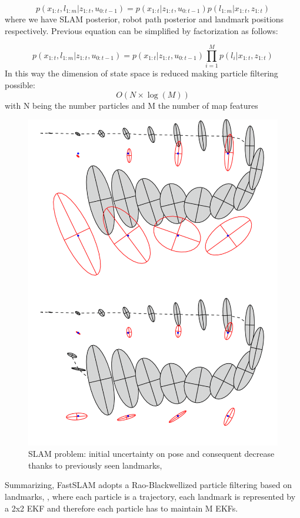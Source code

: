 \begin{equation}
    p(x_{1:t},l_{1:m} | z_{1:t},u_{0:t-1}) = p(x_{1:t} | z_{1:t},u_{0:t-1})p(l_{1:m} | x_{1:t},z_{1:t}) 
\end{equation}
where we have SLAM posterior, robot path posterior and landmark positions respectively. Previous equation can be simplified by factorization as follows:

\begin{equation}
     p(x_{1:t},l_{1:m} | z_{1:t},u_{0:t-1}) = p(x_{1:t} | z_{1:t},u_{0:t-1})\prod_{i=1}^{M}p(l_{i} | x_{1:t},z_{1:t})
\end{equation}
In this way the dimension of state space is reduced making particle filtering possible:
\begin{equation}
    O(N\times\log(M))
\end{equation}
with N being the number particles and M the number of map features
\begin{figure}[H]
    \centering
    \includegraphics[scale=0.34]{Images/Chapter 4/slam_uncertainty.png}
    \caption{SLAM problem: initial uncertainty on pose and consequent decrease thanks to previously seen landmarks, \citet{thrun2004}}
    \label{fig:slam_uncertainty}
\end{figure}
Summarizing, FastSLAM adopts a Rao-Blackwellized particle filtering based on landmarks, \citet{montemerlo2002}, where each particle is a trajectory, each landmark is represented by a 2x2 EKF and therefore each particle has to maintain M EKFs.



